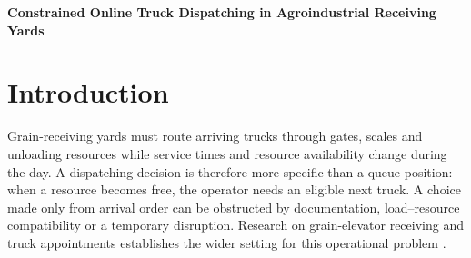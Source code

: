 \documentclass[12pt,a4paper]{article}
\newcommand{\pending}[1]{\textcolor{black!70}{\emph{[Pending: #1]}}}
\begin{document}
\begin{center}
  {\large\bfseries Constrained Online Truck Dispatching in Agroindustrial Receiving Yards}
\end{center}


\begin{abstract}
\normalsize

\noindent \textbf{Paper aims:} To design and evaluate a constrained online dispatching policy for truck receiving yards, where each service decision must respect operational eligibility and remain traceable.\par\smallskip

\noindent \textbf{Originality:} The protocol joins event-triggered dispatching, hard feasibility checks and decision records in a grain-receiving setting. \pending{Establish the specific novelty claim against the verified related-work corpus.}\par\smallskip

\noindent \textbf{Research method:} A discrete-event model compares a lexicographic policy with feasible FIFO, local priority and a fixed-score dynamic rule under paired synthetic scenarios. The protocol evaluates queue waiting, a throughput guard and independent decision-log audits.\par\smallskip

\noindent \textbf{Main findings:} \pending{Insert audited stratum-specific effects, uncertainty and the H1 decision after the complete campaign. No confirmatory findings are available.}\par\smallskip

\noindent \textbf{Implications for theory and practice:} \pending{Interpret the observed findings within the synthetic-yard setting and specify any conditions for operational adoption.}\par\smallskip

\noindent \textbf{Keywords:} discrete-event simulation; queueing; decision support; operational traceability; grain logistics.

\end{abstract}

\section{Introduction}

Grain-receiving yards must route arriving trucks through gates, scales and unloading resources while service times and resource availability change during the day. A dispatching decision is therefore more specific than a queue position: when a resource becomes free, the operator needs an eligible next truck. A choice made only from arrival order can be obstructed by documentation, load–resource compatibility or a temporary disruption. Research on grain-elevator receiving and truck appointments establishes the wider setting for this operational problem \parencite{r.berrutoAnalyzingReceivingOperation2001a,abdelmagidComprehensiveReviewTruck2022a}.
\end{document}
